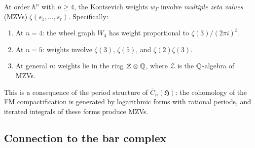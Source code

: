 \begin{proposition}
\label{prop:kontsevich-mzv}
At order $\hbar^n$ with $n \geq 4$, the Kontsevich weights
$w_\Gamma$ involve \emph{multiple zeta values}
(MZVs) $\zeta(s_1, \ldots, s_r)$.  Specifically:
\begin{enumerate}[label=\textup{(\roman*)}]
\item At $n = 4$: the wheel graph $W_4$ has weight proportional
to $\zeta(3)/(2\pi i)^3$.
\item At $n = 5$: weights involve $\zeta(3)$, $\zeta(5)$, and
$\zeta(2)\zeta(3)$.
\item At general $n$: weights lie in the ring
$\mathcal{Z} \otimes \mathbb{Q}$, where $\mathcal{Z}$ is the
$\mathbb{Q}$-algebra of MZVs.
\end{enumerate}
This is a consequence of the period structure of
$\overline{C}_n(\mathfrak{H})$: the cohomology of the FM
compactification is generated by logarithmic forms with
rational periods, and iterated integrals of these forms
produce MZVs.
\end{proposition}


\subsection{Connection to the bar complex}

